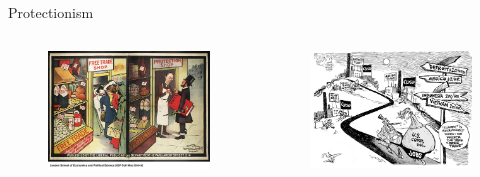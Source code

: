 \documentclass{beamer}
\begin{document}
\begin{frame}{Protectionism}

\begin{columns}{}


\begin{figure}[htpb]
	\centering
	\includegraphics[width=1\textwidth]{../img/prodectionism.jpg}
\end{figure}


\begin{figure}[htpb]
	\centering
	\includegraphics[width=1\linewidth]{../img/freetrade.jpeg}
\end{figure}

\end{columns}{}

\end{frame}
\end{document}
